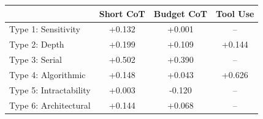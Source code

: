 \begin{tabular}{lccc}
\toprule
 & Short CoT & Budget CoT & Tool Use \\
\midrule
Type 1: Sensitivity & +0.132 & +0.001 & -- \\
Type 2: Depth & +0.199 & +0.109 & +0.144 \\
Type 3: Serial & +0.502 & +0.390 & -- \\
Type 4: Algorithmic & +0.148 & +0.043 & +0.626 \\
Type 5: Intractability & +0.003 & -0.120 & -- \\
Type 6: Architectural & +0.144 & +0.068 & -- \\
\bottomrule
\end{tabular}